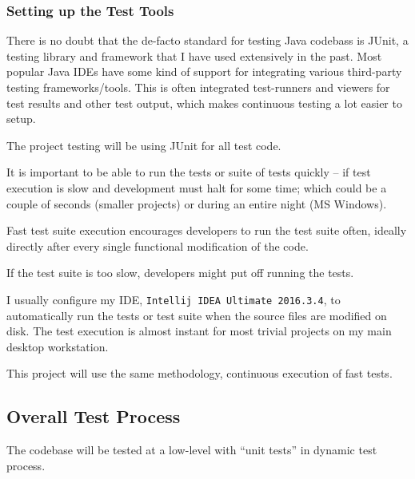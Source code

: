 %
%

\subsubsection{Setting up the Test Tools}
There is no doubt that the de-facto standard for testing Java codebass is
JUnit\cite{tools:junit}, a testing library and framework that I have used
extensively in the past.
Most popular Java IDEs have some kind of support for integrating various
third-party testing frameworks/tools.
This is often integrated test-runners and viewers for test results and other
test output, which makes continuous testing a lot easier to setup.

The project testing will be using JUnit for all test code.

It is important to be able to run the tests or suite of tests quickly -- if
test execution is slow and development must halt for some time; which could be
a couple of seconds (smaller projects) or during an entire night (MS Windows).

Fast test suite execution encourages developers to run the test suite often,
ideally directly after every single functional modification of the code.

If the test suite is too slow, developers might put off running the tests.

I usually configure my IDE, \texttt{Intellij IDEA Ultimate 2016.3.4}, to
automatically run the tests or test suite when the source files are modified on
disk. The test execution is almost instant for most trivial projects on my main
desktop workstation.

This project will use the same methodology, continuous execution of fast tests.

\subsection{Overall Test Process}
The codebase will be tested at a low-level with ``unit tests'' in dynamic test
process.

